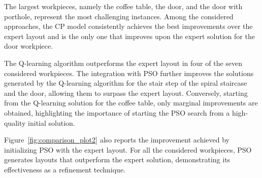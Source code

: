 The largest workpieces, namely the coffee table, the door, and the door with porthole, represent the most challenging instances. Among the considered approaches, the CP model consistently achieves the best improvements over the expert layout and is the only one that improves upon the expert solution for the door workpiece.

The Q-learning algorithm outperforms the expert layout in four of the seven considered workpieces. The integration with PSO further improves the solutions generated by the Q-learning algorithm for the stair step of the spiral staircase and the door, allowing them to surpass the expert layout. Conversely, starting from the Q-learning solution for the coffee table, only marginal improvements are obtained, highlighting the importance of starting the PSO search from a high-quality initial solution.

Figure~\ref{fig:comparison_plot2} also reports the improvement achieved by initializing PSO with the expert layout. For all the considered workpieces, PSO generates layouts that outperform the expert solution, demonstrating its effectiveness as a refinement technique.

